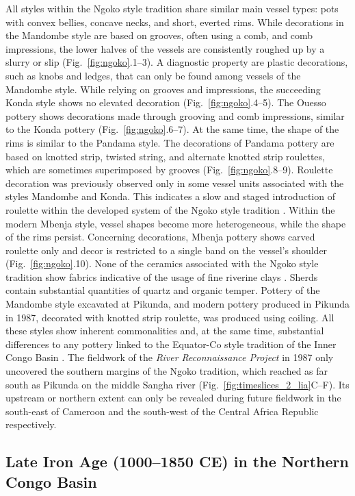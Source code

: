 \documentclass[smallextended,natbib]{svjour3}       %
\begin{document}
All styles within the Ngoko style tradition share similar main vessel types: pots with convex bellies, concave necks, and short, everted rims. While decorations in the Mandombe style are based on grooves, often using a comb, and comb impressions, the lower halves of the vessels are consistently roughed up by a slurry or slip (Fig.~\ref{fig:ngoko}.1--3). A diagnostic property are plastic decorations, such as knobs and ledges, that can only be found among vessels of the Mandombe style. While relying on grooves and impressions, the succeeding Konda style shows no elevated decoration (Fig.~\ref{fig:ngoko}.4--5). The Ouesso pottery shows decorations made through grooving and comb impressions, similar to the Konda pottery (Fig.~\ref{fig:ngoko}.6--7). At the same time, the shape of the rims is similar to the Pandama style. The decorations of Pandama pottery are based on knotted strip, twisted string, and alternate knotted strip roulettes, which are sometimes superimposed by grooves (Fig.~\ref{fig:ngoko}.8--9). Roulette decoration was previously observed only in some vessel units associated with the styles Mandombe and Konda. This indicates a slow and staged introduction of roulette within the developed system of the Ngoko style tradition \citep[120--123]{Seidensticker.2016b}. Within the modern Mbenja style, vessel shapes become more heterogeneous, while the shape of the rims persist. Concerning decorations, Mbenja pottery shows carved roulette only and decor is restricted to a single band on the vessel’s shoulder (Fig.~\ref{fig:ngoko}.10). None of the ceramics associated with the Ngoko style tradition show fabrics indicative of the usage of fine riverine clays \citep{Seidensticker.2020}. Sherds contain substantial quantities of quartz and organic temper. Pottery of the Mandombe style excavated at Pikunda, and modern pottery produced in Pikunda in 1987, decorated with knotted strip roulette, was produced using coiling. All these styles show inherent commonalities and, at the same time, substantial differences to any pottery linked to the Equator-Co style tradition of the Inner Congo Basin \citep{Wotzka.1995}. The fieldwork of the \textit{River Reconnaissance Project} in 1987 only uncovered the southern margins of the Ngoko tradition, which reached as far south as Pikunda on the middle Sangha river (Fig.~\ref{fig:timeslices_2_lia}C--F). Its upstream or northern extent can only be revealed during future fieldwork in the south-east of Cameroon and the south-west of the Central Africa Republic respectively.

\subsection*{Late Iron Age (1000--1850 CE) in the Northern Congo Basin}
\end{document}
